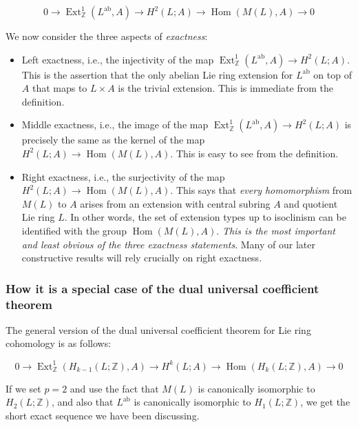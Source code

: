 \documentclass{ucetd}
\begin{document}
\begin{equation*}
  0 \to \operatorname{Ext}^1_{\mathbb{Z}}(L^{\operatorname{ab}},A) \to H^2(L;A) \to \operatorname{Hom}(M(L),A) \to 0
\end{equation*}

We now consider the three aspects of {\em exactness}:

\begin{itemize}
\item Left exactness, i.e., the injectivity of the map
  $\operatorname{Ext}^1_{\mathbb{Z}}(L^{\operatorname{ab}},A) \to
  H^2(L;A)$. This is the assertion that the only abelian Lie ring
  extension for $L^{\operatorname{ab}}$ on top of $A$ that maps to $L
  \times A$ is the trivial extension. This is immediate from the
  definition.
\item Middle exactness, i.e., the image of the map
  $\operatorname{Ext}^1_{\mathbb{Z}}(L^{\operatorname{ab}},A) \to
  H^2(L;A)$ is precisely the same as the kernel of the map $ H^2(L;A)
  \to \operatorname{Hom}(M(L),A)$. This is easy to see from the
  definition.
\item Right exactness, i.e., the surjectivity of the map $H^2(L;A) \to
  \operatorname{Hom}(M(L),A)$. This says that {\em every homomorphism}
  from $M(L)$ to $A$ arises from an extension with central subring
  $A$ and quotient Lie ring $L$. In other words, the set of extension
  types up to isoclinism can be identified with the group
  $\operatorname{Hom}(M(L),A)$. {\em This is the most important and
    least obvious of the three exactness statements}. Many of our
  later constructive results will rely crucially on right exactness.
\end{itemize}

\subsubsection{How it is a special case of the dual universal coefficient theorem}

The general version of the dual universal coefficient theorem for
Lie ring cohomology is as follows:

$$0 \to \operatorname{Ext}^1_{\mathbb{Z}}(H_{k-1}(L;\mathbb{Z}),A) \to H^k(L;A) \to \operatorname{Hom}(H_k(L;\mathbb{Z}),A) \to 0$$

If we set $p = 2$ and use the fact that $M(L)$ is canonically
isomorphic to $H_2(L;\mathbb{Z})$, and also that
$L^{\operatorname{ab}}$ is canonically isomorphic to
$H_1(L;\mathbb{Z})$, we get the short exact sequence we have been
discussing.
\end{document}
